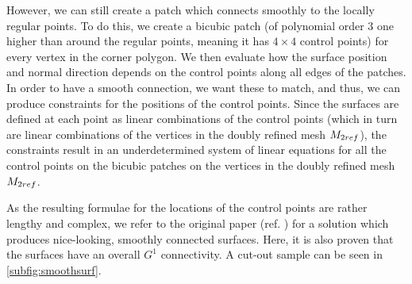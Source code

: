 However, we can still create a \Bez patch which connects smoothly to the locally regular points. To do this, we create a bicubic \Bez patch (of polynomial order 3 one higher than around the regular points, meaning it has $4\times4$ control points) for every vertex in the corner polygon.
We then evaluate how the surface position and normal direction depends on the \Bez control points along all edges of the patches. In order to have a smooth connection, we want these to match, and thus, we can produce constraints for the positions of the \Bez control points.
Since the surfaces are defined at each point as linear combinations of the \Bez control points (which in turn are linear combinations of the vertices in the doubly refined mesh $\petersControlMeshDobRef$), the constraints result in an underdetermined system of linear equations for all the \Bez control points on the bicubic \Bez patches on the vertices in the doubly refined mesh $\petersControlMeshDobRef$.

As the resulting formulae for the locations of the \Bez control points are rather lengthy and complex, we refer to the original paper (ref. \cite{peters1992constructing}) for a solution which produces nice-looking, smoothly connected surfaces. Here, it is also proven that the surfaces have an overall $G^1$ connectivity. A cut-out sample can be seen in \autoref{subfig:smoothsurf}.

